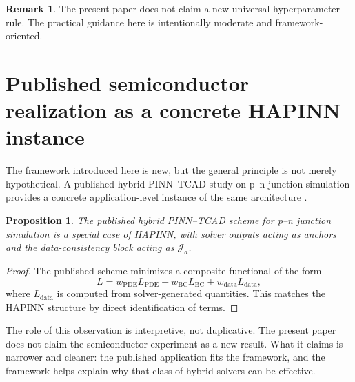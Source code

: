 \documentclass[preprint,12pt]{elsarticle}
\newtheorem{proposition}[theorem]{Proposition}
\theoremstyle{definition}
\newtheorem{remark}[theorem]{Remark}
\numberwithin{equation}{section}
\begin{document}
\begin{remark}
The present paper does not claim a new universal hyperparameter rule. The practical guidance here is intentionally moderate and framework-oriented.
\end{remark}

\section{Published semiconductor realization as a concrete HAPINN instance}
\label{sec:instance}

The framework introduced here is new, but the general principle is not merely hypothetical. A published hybrid PINN--TCAD study on p--n junction simulation provides a concrete application-level instance of the same architecture \cite{PetrosyanYepiskoposyan2026}.

\begin{proposition}
The published hybrid PINN--TCAD scheme for p--n junction simulation is a special case of HAPINN, with solver outputs acting as anchors and the data-consistency block acting as $\mathcal{J}_a$.
\end{proposition}

\begin{proof}
The published scheme minimizes a composite functional of the form
\[
L=w_{\mathrm{PDE}}L_{\mathrm{PDE}}+w_{\mathrm{BC}}L_{\mathrm{BC}}+w_{\mathrm{data}}L_{\mathrm{data}},
\]
where $L_{\mathrm{data}}$ is computed from solver-generated quantities. This matches the HAPINN structure by direct identification of terms.
\end{proof}

The role of this observation is interpretive, not duplicative. The present paper does not claim the semiconductor experiment as a new result. What it claims is narrower and cleaner: the published application fits the framework, and the framework helps explain why that class of hybrid solvers can be effective.
\end{document}
